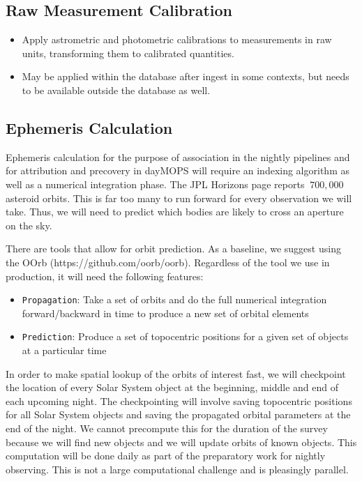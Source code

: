 \subsection{Raw Measurement Calibration}
\label{sec:acRawMeasurementCalibration}

\begin{itemize}
\item Apply astrometric and photometric calibrations to measurements in raw units, transforming them to calibrated quantities.
\item May be applied within the database after ingest in some contexts, but needs to be available outside the database as well.
\end{itemize}


\subsection{Ephemeris Calculation}
\label{sec:acEphemerisCalculation}
Ephemeris calculation for the purpose of association in the nightly pipelines and for attribution and precovery in dayMOPS will require an indexing algorithm as well as a numerical integration phase. The JPL Horizons page reports $~700,000$ asteroid orbits.  This is far too many to run forward for every observation we will take.  Thus, we will need to predict which bodies are likely to cross an aperture on the sky.

There are tools that allow for orbit prediction.  As a baseline, we suggest using the OOrb (https://github.com/oorb/oorb).  Regardless of the tool we use in production, it will need the following features:
\begin{itemize}
\item \texttt{Propagation}: Take a set of orbits and do the full numerical integration forward/backward in time to produce a new set of orbital elements
\item \texttt{Prediction}: Produce a set of topocentric positions for a given set of objects at a particular time
\end{itemize}

In order to make spatial lookup of the orbits of interest fast, we will checkpoint the location of every Solar System object at the beginning, middle and end of each upcoming night.  The checkpointing will involve saving topocentric positions for all Solar System objects and saving the propagated orbital parameters at the end of the night.  We cannot precompute this for the duration of the survey because we will find new objects and we will update orbits of known objects.  This computation will be done daily as part of the preparatory work for nightly observing.  This is not a large computational challenge and is pleasingly parallel.

